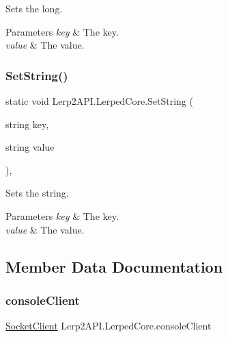 Sets the long. 


\begin{DoxyParams}{Parameters}
{\em key} & The key.\\
\hline
{\em value} & The value.\\
\hline
\end{DoxyParams}
\mbox{\label{class_lerp2_a_p_i_1_1_lerped_core_a37695960379368ba971962941ced7c0b}} 
\subsubsection{\texorpdfstring{Set\+String()}{SetString()}}
{\footnotesize\ttfamily static void Lerp2\+A\+P\+I.\+Lerped\+Core.\+Set\+String (\begin{DoxyParamCaption}\item[{string}]{key,  }\item[{string}]{value }\end{DoxyParamCaption})\hspace{0.3cm}{\ttfamily [inline]}, {\ttfamily [static]}}



Sets the string. 


\begin{DoxyParams}{Parameters}
{\em key} & The key.\\
\hline
{\em value} & The value.\\
\hline
\end{DoxyParams}


\subsection{Member Data Documentation}
\mbox{\label{class_lerp2_a_p_i_1_1_lerped_core_a16e880ea6278c92f3363dabb264a0eba}} 
\subsubsection{\texorpdfstring{console\+Client}{consoleClient}}
{\footnotesize\ttfamily \hyperlink{class_lerp2_a_p_i_1_1_communication_1_1_sockets_1_1_socket_client}{Socket\+Client} Lerp2\+A\+P\+I.\+Lerped\+Core.\+console\+Client\hspace{0.3cm}{\ttfamily [static]}}




